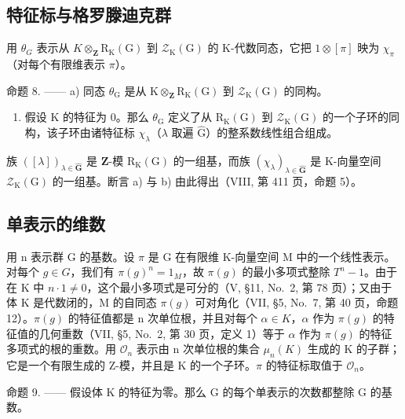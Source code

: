 \subsection{特征标与格罗滕迪克群}

用 \(\theta_{G}\) 表示从 \(K\otimes_{\mathbf{Z}}\mathrm{R}_{\mathrm{K}}(\mathrm{G})\) 到 \(\mathcal{Z}_{\mathrm{K}}(\mathrm{G})\) 的 K-代数同态，它把 \(1\otimes[\pi]\) 映为 \(\chi_{\pi}\)（对每个有限维表示 \(\pi\)）。

命题 8. —— a) 同态 \(\theta_{\mathrm{G}}\) 是从 \(\mathrm{K} \otimes_{\mathbf{Z}} \mathrm{R}_{\mathrm{K}}(\mathrm{G})\) 到 \(\mathcal{Z}_{\mathrm{K}}(\mathrm{G})\) 的同构。

\begin{enumerate}
\def\labelenumi{\alph{enumi})}
\setcounter{enumi}{1}
\tightlist
\item
  假设 K 的特征为 0。那么 \(\theta_{\mathrm{G}}\) 定义了从 \(\mathrm{R}_{\mathrm{K}}(\mathrm{G})\) 到 \(\mathcal{Z}_{\mathrm{K}}(\mathrm{G})\) 的一个子环的同构，该子环由诸特征标 \(\chi_{\lambda}\)（\(\lambda\) 取遍 \(\widehat{\mathrm{G}}\)）的整系数线性组合组成。
\end{enumerate}

族 \(([\lambda])_{\lambda \in \widehat{\mathbf{G}}}\) 是 \(\mathbf{Z}\)-模 \(\mathrm{R}_{\mathrm{K}}(\mathrm{G})\) 的一组基，而族 \((\chi_{\lambda})_{\lambda \in \widehat{\mathbf{G}}}\) 是 K-向量空间 \(\mathcal{Z}_{\mathrm{K}}(\mathrm{G})\) 的一组基。断言 a) 与 b) 由此得出（VIII, 第 411 页，命题 5）。

\subsection{单表示的维数}

用 n 表示群 G 的基数。设 \(\pi\) 是 G 在有限维 K-向量空间 M 中的一个线性表示。对每个 \(g \in G\)，我们有 \(\pi(g)^{n} = 1_{M}\)，故 \(\pi(g)\) 的最小多项式整除 \(T^{n} - 1\)。由于在 K 中 \(n \cdot 1 \neq 0\)，这个最小多项式是可分的（V, §11, No.~2, 第 78 页）；又由于体 K 是代数闭的，M 的自同态 \(\pi(g)\) 可对角化（VII, §5, No.~7, 第 40 页，命题 12）。\(\pi(g)\) 的特征值都是 n 次单位根，并且对每个 \(\alpha \in K\)，\(\alpha\) 作为 \(\pi(g)\) 的特征值的几何重数（VII, §5, No.~2, 第 30 页，定义 1）等于 \(\alpha\) 作为 \(\pi(g)\) 的特征多项式的根的重数。用 \(\mathcal{O}_{n}\) 表示由 n 次单位根的集合 \(\mu_{n}(K)\) 生成的 K 的子群；它是一个有限生成的 Z-模，并且是 K 的一个子环。\(\pi\) 的特征标取值于 \(\mathcal{O}_{n}\)。

命题 9. —— 假设体 K 的特征为零。那么 G 的每个单表示的次数都整除 G 的基数。

